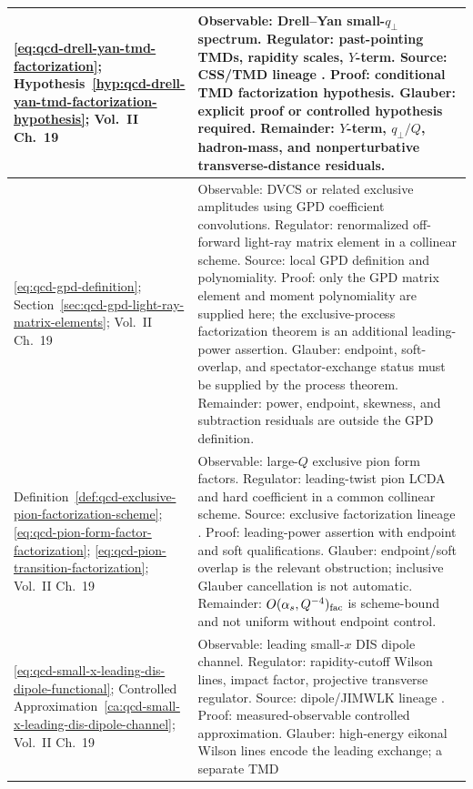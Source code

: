 {\begin{longtable}{@{}>{\raggedright\arraybackslash}p{}>{\raggedright\arraybackslash}p{}@{}}
\\ \hline
\eqref{eq:qcd-drell-yan-tmd-factorization};
Hypothesis~\ref{hyp:qcd-drell-yan-tmd-factorization-hypothesis};
Vol.~II Ch.~19 &
Observable: Drell--Yan small-\(q_\perp\) spectrum.  Regulator: past-pointing
TMDs, rapidity scales, \(Y\)-term.  Source: CSS/TMD lineage
\cite{CollinsSoperSterman1989Factorization}.  Proof: conditional TMD
factorization hypothesis.  Glauber: explicit proof or controlled hypothesis
required.  Remainder: \(Y\)-term, \(q_\perp/Q\), hadron-mass, and
nonperturbative transverse-distance residuals.
\\ \hline
\eqref{eq:qcd-gpd-definition};
Section~\ref{sec:qcd-gpd-light-ray-matrix-elements};
Vol.~II Ch.~19 &
Observable: DVCS or related exclusive amplitudes using GPD coefficient
convolutions.  Regulator: renormalized off-forward light-ray matrix element in
a collinear scheme.  Source: local GPD definition and polynomiality.  Proof:
only the GPD matrix element and moment polynomiality are supplied here; the
exclusive-process factorization theorem is an additional leading-power
assertion.  Glauber: endpoint, soft-overlap, and spectator-exchange status must
be supplied by the process theorem.  Remainder: power, endpoint, skewness, and
subtraction residuals are outside the GPD definition.
\\ \hline
Definition~\ref{def:qcd-exclusive-pion-factorization-scheme};
\eqref{eq:qcd-pion-form-factor-factorization};
\eqref{eq:qcd-pion-transition-factorization};
Vol.~II Ch.~19 &
Observable: large-\(Q\) exclusive pion form factors.  Regulator:
leading-twist pion LCDA and hard coefficient in a common collinear scheme.
Source: exclusive factorization lineage
\cite{BrodskyLepage1980Exclusive,EfremovRadyushkin1980PionFormFactor}.
Proof: leading-power assertion with endpoint and soft qualifications.
Glauber: endpoint/soft overlap is the relevant obstruction; inclusive Glauber
cancellation is not automatic.  Remainder: \(O(\alpha_s,Q^{-4})_{\rm fac}\)
is scheme-bound and not uniform without endpoint control.
\\ \hline
\eqref{eq:qcd-small-x-leading-dis-dipole-functional};
Controlled Approximation~\ref{ca:qcd-small-x-leading-dis-dipole-channel};
Vol.~II Ch.~19 &
Observable: leading small-\(x\) DIS dipole channel.  Regulator:
rapidity-cutoff Wilson lines, impact factor, projective transverse regulator.
Source: dipole/JIMWLK lineage
\cite{NikolaevZakharov1991,Balitsky1996HighEnergy,Kovchegov1999SmallXF2}.
Proof: measured-observable controlled approximation.  Glauber: high-energy
eikonal Wilson lines encode the leading exchange; a separate TMD

\end{longtable}}
